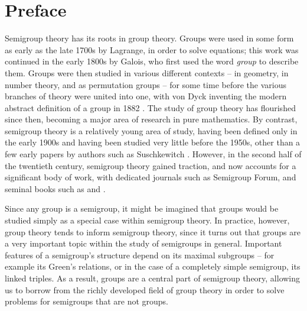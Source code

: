 \chapter*{Preface}

Semigroup theory has its roots in group theory.  Groups were used in some form
as early as the late 1700s by Lagrange, in order to solve equations; this work
was continued in the early 1800s by Galois, who first used the word
\textit{group} to describe them.  Groups were then studied in various different
contexts -- in geometry, in number theory, and as permutation groups -- for some
time before the various branches of theory were united into one, with von Dyck
inventing the modern abstract definition of a group in 1882 \cite{dyck_1882}.
The study of group theory has flourished since then, becoming a major area of
research in pure mathematics.  By contrast, semigroup theory is a relatively
young area of study, having been defined only in the early 1900s and having been
studied very little before the 1950s, other than a few early papers by authors
such as Suschkewitch \cite{susch_1928}.  However, in the second half of the
twentieth century, semigroup theory gained traction, and now accounts for a
significant body of work, with dedicated journals such as Semigroup Forum, and
seminal books such as \cite{howie} and \cite{petrich}.

Since any group is a semigroup, it might be imagined that groups would be
studied simply as a special case within semigroup theory.  In practice, however,
group theory tends to inform semigroup theory, since it turns out that groups
are a very important topic within the study of semigroups in general.  Important
features of a semigroup's structure depend on its maximal subgroups --
for example its Green's relations, or in the case of a completely simple
semigroup, its linked triples.  As a result, groups are a central part of
semigroup theory, allowing us to borrow from the richly developed field of group
theory in order to solve problems for semigroups that are not groups.

